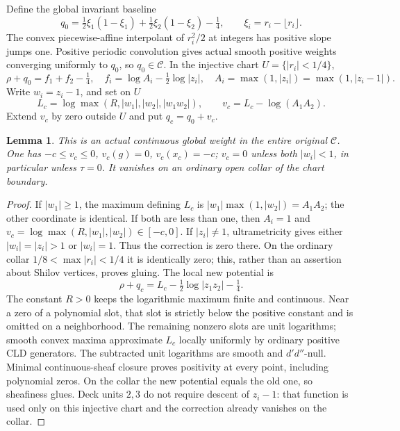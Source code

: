 \documentclass[11pt]{article}
\newtheorem{lemma}[theorem]{Lemma}
\newcommand{\DD}{d'd''}
\newcommand{\C}{\mathcal C}
\begin{document}
Define the global invariant baseline
\[
 q_0=\tfrac12\xi_1(1-\xi_1)+\tfrac12\xi_2(1-\xi_2)-\tfrac14,
 \qquad \xi_i=r_i-\lfloor r_i\rfloor.
\]
The convex piecewise-affine interpolant of $r_i^2/2$ at integers has
positive slope jumps one. Positive periodic convolution gives actual
smooth positive weights converging uniformly to $q_0$, so $q_0\in\C$.
In the injective chart $U=\{|r_i|<1/4\}$,
\[
 \rho+q_0=f_1+f_2-\tfrac14,
 \quad f_i=\log A_i-\tfrac12\log|z_i|,
 \quad A_i=\max(1,|z_i|)=\max(1,|z_i-1|).
\]
Write $w_i=z_i-1$, and set on $U$
\[
 L_c=\log\max(R,|w_1|,|w_2|,|w_1w_2|),\qquad
 v_c=L_c-\log(A_1A_2).
\]
Extend $v_c$ by zero outside $U$ and put $q_c=q_0+v_c$.

\begin{lemma}\label{newns:glue}
This is an actual continuous global weight in the entire original $\C$.
One has $-c\le v_c\le0$, $v_c(g)=0$, $v_c(x_c)=-c$;
$v_c=0$ unless both $|w_i|<1$, in particular unless $\tau=0$.
It vanishes on an ordinary open collar of the chart boundary.
\end{lemma}
\begin{proof}
If $|w_1|\ge1$, the maximum defining $L_c$ is
$|w_1|\max(1,|w_2|)=A_1A_2$; the other coordinate is identical.
If both are less than one, then $A_i=1$ and
$v_c=\log\max(R,|w_1|,|w_2|)\in[-c,0]$.
If $|z_i|\ne1$, ultrametricity gives either $|w_i|=|z_i|>1$
or $|w_i|=1$. Thus the correction is zero there.
On the ordinary collar $1/8<\max|r_i|<1/4$ it is identically zero;
this, rather than an assertion about Shilov vertices, proves gluing.
The local new potential is
\[
 \rho+q_c=L_c-\tfrac12\log|z_1z_2|-\tfrac14.
\]
The constant $R>0$ keeps the logarithmic maximum finite and continuous.
Near a zero of a polynomial slot, that slot is strictly below the
positive constant and is omitted on a neighborhood. The remaining
nonzero slots are unit logarithms; smooth convex maxima approximate
$L_c$ locally uniformly by ordinary positive CLD generators.
The subtracted unit logarithms are smooth and $\DD$-null. Minimal
continuous-sheaf closure proves positivity at every point, including
polynomial zeros. On the collar the new potential equals the old one,
so sheafiness glues. Deck units $2,3$ do not require descent of $z_i-1$:
that function is used only on this injective chart and the correction
already vanishes on the collar.
\end{proof}
\end{document}
